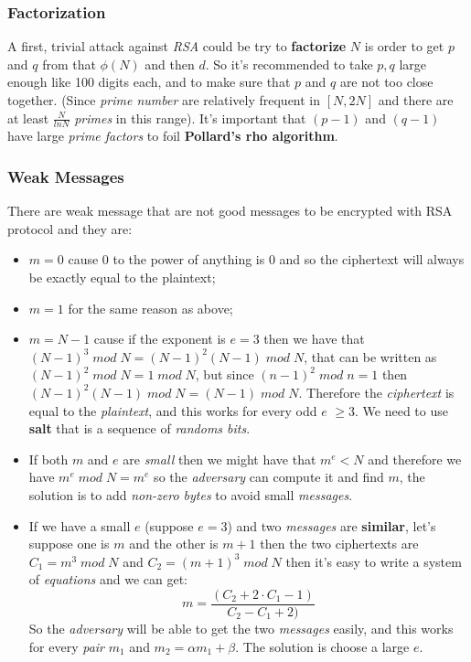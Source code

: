 \documentclass{article}
\begin{document}
\subsubsection{Factorization}
A first, trivial attack against \emph{RSA} could be try to \textbf{factorize} $N$ is order to get $p$ and $q$ from that $\phi(N)$ and then $d$. So it's recommended to take $p,q$ large enough like 100 digits each, and to make sure that $p$ and $q$ are not too close together. (Since \emph{prime number} are relatively frequent in $\left[N,2N \right]$ and there are at least $\frac{N}{lnN}$ \emph{primes} in this range). It's important that $(p-1)$ and $(q-1)$ have large \emph{prime factors} to foil \textbf{Pollard's rho algorithm}.
\subsubsection{Weak Messages}
There are weak message that are not good messages to be encrypted with RSA protocol and they are:
\begin{itemize}
\item $m=0$ cause 0 to the power of anything is 0 and so the ciphertext will always be exactly equal to the plaintext;
\item $m=1$ for the same reason as above;
\item $m=N-1$ cause if the exponent is $e=3$ then we have that $(N-1)^3 \; mod\; N = (N-1)^2(N-1)\; mod\; N$, that can be written as $(N-1)^2 \;mod\; N = 1 \;mod\; N$, but since $(n-1)^2\; mod\; n = 1$ then $(N-1)^2(N-1) \;mod\; N = (N-1) \;mod\; N$. Therefore the \emph{ciphertext} is equal to the \emph{plaintext}, and this works for every odd $e$ $\geq 3$. We need to use \textbf{salt} that is a sequence of \emph{randoms bits}.
\item If both $m$ and $e$ are \emph{small} then we might have that $m^e < N$ and therefore we have $m^e \; mod \; N = m^e$ so the \emph{adversary} can compute it and find $m$, the solution is to add \emph{non-zero bytes} to avoid small \emph{messages}. 
\item If we have a small $e$ (suppose $e=3$) and two \emph{messages} are \textbf{similar}, let's suppose one is $m$ and the other is $m+1$ then the two ciphertexts are $C_1=m^3\; mod \;N$ and $C_2 = (m+1)^3\; mod\; N$ then it's easy to write a system of \emph{equations} and we can get:
\[ m =\frac{(C_2 + 2 \cdot C_1 - 1)}{C_2 - C_1 +2)} \] So the \emph{adversary} will be able to get the two \emph{messages} easily, and this works for every \emph{pair} $m_1$ and $m_2 = \alpha m_1 + \beta$. The solution is choose a large $e$. 
\end{itemize}
\end{document}
